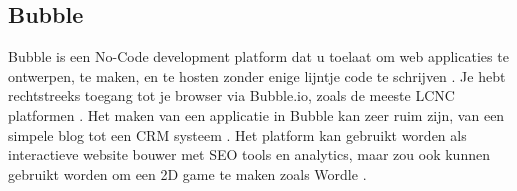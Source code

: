 

\subsection{Bubble}%
\label{subsec:bubble}
Bubble is een No-Code development platform dat u toelaat om web applicaties te ontwerpen, te maken, en te hosten zonder enige lijntje code te schrijven \autocite{Sharma2022}.
Je hebt rechtstreeks toegang tot je browser via Bubble.io, zoals de meeste LCNC platformen \autocite{Minor2022}. Het maken van een applicatie in Bubble kan zeer ruim zijn, van een simpele blog tot een CRM systeem \autocite{Sharma2022}.
Het platform kan gebruikt worden als interactieve website bouwer met SEO tools en analytics, maar zou ook kunnen gebruikt worden om een 2D game te maken zoals Wordle \autocite{Minor2022}.

